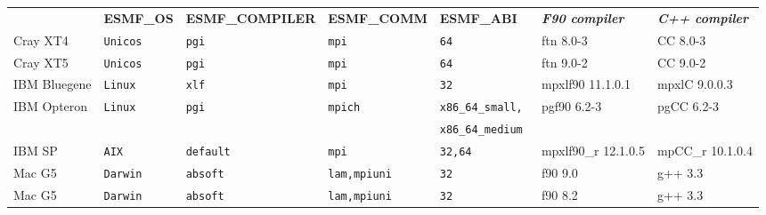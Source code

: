\begin{tabular}{lllllll}
  &{\bfseries\footnotesize ESMF\_OS} &{\bfseries\footnotesize ESMF\_COMPILER} & {\bfseries\footnotesize ESMF\_COMM} & {\bfseries\footnotesize ESMF\_ABI} &
  {\bfseries\footnotesize\it F90 compiler} & {\bfseries\footnotesize\it C++ compiler} \\

Cray XT4              &\tt Unicos &\tt pgi          &\tt mpi        &\tt 64              & ftn \footnotesize 8.0-3            & CC \footnotesize 8.0-3          \\
Cray XT5              &\tt Unicos &\tt pgi          &\tt mpi        &\tt 64              & ftn \footnotesize 9.0-2            & CC \footnotesize 9.0-2          \\
IBM Bluegene          &\tt Linux  &\tt xlf          &\tt mpi        &\tt 32              & mpxlf90 \footnotesize 11.1.0.1     & mpxlC \footnotesize 9.0.0.3     \\
IBM Opteron           &\tt Linux  &\tt pgi          &\tt mpich      &\tt x86\_64\_small, & pgf90 \footnotesize 6.2-3          & pgCC \footnotesize 6.2-3        \\
                      &           &                 &               &\tt x86\_64\_medium &                                    &                                 \\
IBM SP                &\tt AIX    &\tt default      &\tt mpi        &\tt 32,64           & mpxlf90\_r \footnotesize 12.1.0.5  & mpCC\_r \footnotesize 10.1.0.4  \\
Mac G5                &\tt Darwin &\tt absoft       &\tt lam,mpiuni &\tt 32              & f90 \footnotesize 9.0              & g++ \footnotesize 3.3           \\
Mac G5                &\tt Darwin &\tt absoft       &\tt lam,mpiuni &\tt 32              & f90 \footnotesize 8.2              & g++ \footnotesize 3.3           \\

\end{tabular}
